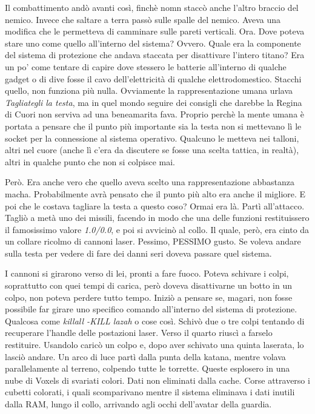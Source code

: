     Il combattimento andò avanti così, finchè nomn staccò anche l'altro braccio del nemico. Invece che saltare a terra
    passò sulle spalle del nemico. Aveva una modifica che le permetteva di camminare sulle pareti verticali. Ora. Dove
    poteva stare uno come quello all'interno del sistema? Ovvero. Quale era la componente del sistema di protezione che
    andava staccata per disattivare l'intero titano? Era un po' come tentare di capire dove stessero le batterie
    all'interno di qualche gadget o di dive fosse il cavo dell'elettricità di qualche elettrodomestico. Stacchi quello,
    non funziona più nulla. Ovviamente la rappresentazione umana urlava \emph{Tagliategli la testa}, ma in quel mondo
    seguire dei consigli che darebbe la Regina di Cuori non serviva ad una beneamarita fava. Proprio perchè la mente
    umana è portata a pensare che il punto più importante sia la testa non si mettevano lì le socket per la connessione
    al sistema operativo. Qualcuno le metteva nei talloni, altri nel cuore (anche lì c'era da discutere se fosse una
    scelta tattica, in realtà), altri in qualche punto che non si colpisce mai.

    Però. Era anche vero che quello aveva scelto una rappresentazione abbastanza macha. Probabilmente avrà pensato che
    il punto più alto era anche il migliore. E poi che le costava tagliare la testa a questo coso? Ormai era là. Partì
    all'attacco. Tagliò a metà uno dei missili, facendo in modo che una delle funzioni restituissero il famosissimo
    valore \emph{1.0/0.0}, e poi si avvicinò al collo. Il quale, però, era cinto da un collare ricolmo di cannoni laser.
    Pessimo, PESSIMO gusto. Se voleva andare sulla testa per vedere di fare dei danni seri doveva passare quel sistema.
    
    I cannoni si girarono verso di lei, pronti a fare fuoco. Poteva schivare i colpi, soprattutto con quei tempi di
    carica, però doveva disattivarne un botto in un colpo, non poteva perdere tutto tempo. Iniziò a pensare se, magari,
    non fosse possibile far girare uno specifico comando all'interno del sistema di protezione. Qualcosa come
    \emph{killall -KILL lazah} o cose così. Schivò due o tre colpi tentando di recuperare l'handle delle postazioni
    laser. Verso il quarto riuscì a farselo restituire. Usandolo caricò un colpo e, dopo aver schivato una quinta
    laserata, lo lasciò andare. Un arco di luce partì dalla punta della katana, mentre volava parallelamente al terreno,
    colpendo tutte le torrette. Queste esplosero in una nube di Voxels di svariati colori. Dati non eliminati dalla
    cache. Corse attraverso i cubetti colorati, i quali scomparivano mentre il sistema eliminava i dati inutili dalla
    RAM, lungo il collo, arrivando agli occhi dell'avatar della guardia.

